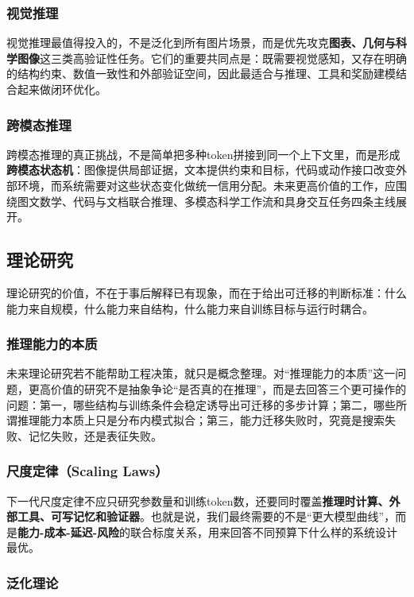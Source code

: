 \documentclass[12pt,a4paper]{article}
\begin{document}
\subsubsection{视觉推理}

视觉推理最值得投入的，不是泛化到所有图片场景，而是优先攻克\textbf{图表、几何与科学图像}这三类高验证性任务。它们的重要共同点是：既需要视觉感知，又存在明确的结构约束、数值一致性和外部验证空间，因此最适合与推理、工具和奖励建模结合起来做闭环优化。

\subsubsection{跨模态推理}

跨模态推理的真正挑战，不是简单把多种token拼接到同一个上下文里，而是形成\textbf{跨模态状态机}：图像提供局部证据，文本提供约束和目标，代码或动作接口改变外部环境，而系统需要对这些状态变化做统一信用分配。未来更高价值的工作，应围绕图文数学、代码与文档联合推理、多模态科学工作流和具身交互任务四条主线展开。

\subsection{理论研究}

理论研究的价值，不在于事后解释已有现象，而在于给出可迁移的判断标准：什么能力来自规模，什么能力来自结构，什么能力来自训练目标与运行时耦合。

\subsubsection{推理能力的本质}

未来理论研究若不能帮助工程决策，就只是概念整理。对“推理能力的本质”这一问题，更高价值的研究不是抽象争论“是否真的在推理”，而是去回答三个更可操作的问题：第一，哪些结构与训练条件会稳定诱导出可迁移的多步计算；第二，哪些所谓推理能力本质上只是分布内模式拟合；第三，能力迁移失败时，究竟是搜索失败、记忆失败，还是表征失败。

\subsubsection{尺度定律（Scaling Laws）}

下一代尺度定律不应只研究参数量和训练token数，还要同时覆盖\textbf{推理时计算、外部工具、可写记忆和验证器}。也就是说，我们最终需要的不是“更大模型曲线”，而是\textbf{能力-成本-延迟-风险}的联合标度关系，用来回答不同预算下什么样的系统设计最优。

\subsubsection{泛化理论}
\end{document}
